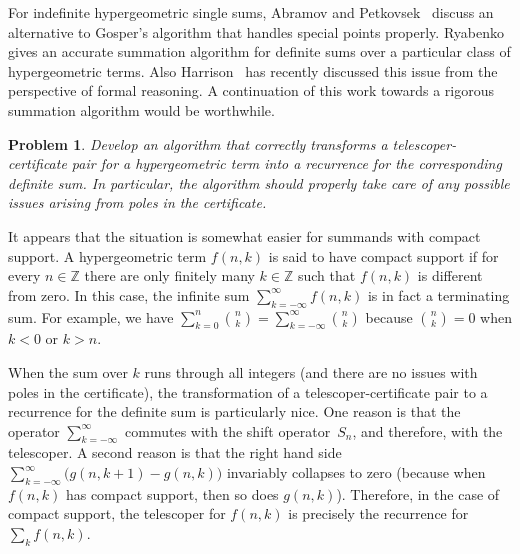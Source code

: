 \documentclass[a4paper,draft]{amsart}
\let\set\mathbb
\newtheorem{problem}{Problem}
\begin{document}
 For indefinite hypergeometric single sums, Abramov and Petkovsek~\cite{abramov05}
 discuss an alternative to Gosper's algorithm that handles special points
 properly. Ryabenko~\cite{ryabenko11} gives an accurate summation algorithm for
 definite sums over a particular class of hypergeometric terms.
 Also Harrison~\cite{harrison15} has recently discussed this issue from the perspective
 of formal reasoning. A continuation of this work towards a rigorous summation algorithm
 would be worthwhile.

 \begin{problem}
   Develop an algorithm that correctly transforms a telescoper-certificate pair
   for a hypergeometric term into a recurrence for the corresponding definite
   sum.  In particular, the algorithm should properly take care of any possible
   issues arising from poles in the certificate.
 \end{problem}

 It appears that the situation is somewhat easier for summands with compact
 support. A hypergeometric term $f(n,k)$ is said to have compact support if for
 every $n\in\set Z$ there are only finitely many $k\in\set Z$ such that $f(n,k)$
 is different from zero. In this case, the infinite sum $\sum_{k=-\infty}^\infty
 f(n,k)$ is in fact a terminating sum. For example, we have $\sum_{k=0}^n\binom
 nk=\sum_{k=-\infty}^\infty\binom nk$ because $\binom nk=0$ when $k<0$ or $k>n$.

 When the sum over $k$ runs through all integers (and there are no issues with
 poles in the certificate), the transformation of a telescoper-certificate pair
 to a recurrence for the definite sum is particularly nice. One reason is that
 the operator $\sum_{k=-\infty}^\infty$ commutes with the shift operator~$S_n$,
 and therefore, with the telescoper. A second reason is that the right hand side
 $\sum_{k=-\infty}^\infty\bigl(g(n,k+1)-g(n,k)\bigr)$ invariably collapses to
 zero (because when $f(n,k)$ has compact support, then so does
 $g(n,k)$). Therefore, in the case of compact support, the telescoper for
 $f(n,k)$ is precisely the recurrence for $\sum_k f(n,k)$.
\end{document}
